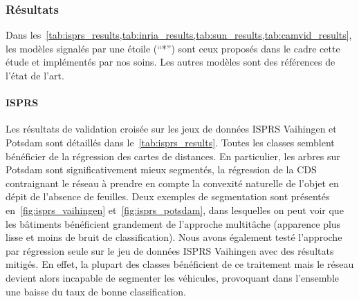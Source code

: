 \subsubsection{Résultats}

Dans les~\cref{tab:isprs_results,tab:inria_results,tab:sun_results,tab:camvid_results}, les modèles signalés par une étoile (``*'') sont ceux proposés dans le cadre cette étude et implémentés par nos soins. Les autres modèles sont des références de l'état de l'art.

\paragraph{ISPRS}
Les résultats de validation croisée sur les jeux de données ISPRS Vaihingen et Potsdam sont détaillés dans le~\cref{tab:isprs_results}. Toutes les classes semblent bénéficier de la régression des cartes de distances. En particulier, les arbres sur Potsdam sont significativement mieux segmentés, la régression de la CDS contraignant le réseau à prendre en compte la convexité naturelle de l'objet en dépit de l'absence de feuilles. Deux exemples de segmentation sont présentés en~\cref{fig:isprs_vaihingen} et~\cref{fig:isprs_potsdam}, dans lesquelles on peut voir que les bâtiments bénéficient grandement de l'approche multitâche (apparence plus lisse et moins de bruit de classification). Nous avons également testé l'approche par régression seule sur le jeu de données ISPRS Vaihingen avec des résultats mitigés. En effet, la plupart des classes bénéficient de ce traitement mais le réseau devient alors incapable de segmenter les véhicules, provoquant dans l'ensemble une baisse du taux de bonne classification.

